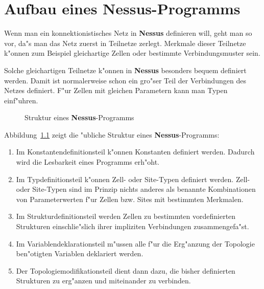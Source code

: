 \chapter{Aufbau eines Nessus-Programms}
\label{Programmaufbau}

Wenn man ein konnektionistisches Netz in {\bf Nessus} definieren will,
geht man so vor, da"s man das Netz zuerst in Teilnetze
zerlegt.  Merkmale dieser Teilnetze k"onnen zum Beispiel gleichartige
Zellen oder bestimmte Verbindungsmuster sein.

Solche gleichartigen Teilnetze k"onnen in {\bf Nessus} besonders
bequem definiert werden.  Damit ist normalerweise schon ein gro"ser
Teil der Verbindungen des Netzes definiert.  F"ur Zellen mit gleichen
Parametern kann man Typen einf"uhren.

\begin{figure}[htb]
  \small
  \begin{center}
      \makebox[\textwidth][c]{
	   
      }
    \caption{\label{KB1} Struktur eines {\bf Nessus}-Programms}
  \end{center}
\end{figure}

Abbildung~\ref{KB1} zeigt die "ubliche Struktur eines {\bf Nessus}-Programms:

\begin{enumerate}
  
\item Im Konstantendefinitionsteil k"onnen Konstanten
 definiert werden.  Dadurch wird die
Lesbarkeit eines Programms erh"oht.
  
\item Im Typdefinitionsteil k"onnen Zell- oder Site-Typen definiert
werden. Zell- oder Site-Typen sind im Prinzip nichts anderes als
benannte Kombinationen von Parameterwerten f"ur Zellen bzw. Sites
mit bestimmten Merkmalen.
  
\item Im Strukturdefinitionsteil werden Zellen zu bestimmten
vordefinierten Strukturen einschlie"slich ihrer impliziten
Verbindungen zusammengefa"st.
  
\item Im Variablendeklarationsteil m"ussen alle f"ur die Erg"anzung
der Topologie 	ben"otigten Variablen
deklariert werden.
  
\item Der Topologiemodifikationsteil dient dann dazu,
die bisher definierten 	Strukturen zu erg"anzen und miteinander zu
verbinden.
\end{enumerate}

